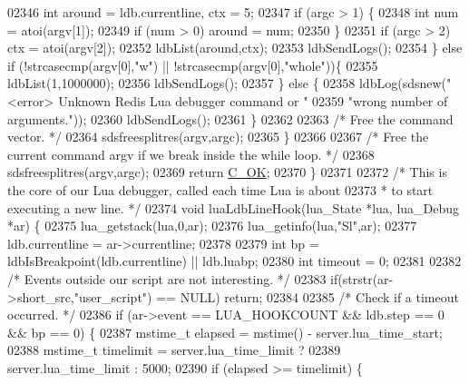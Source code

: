 \begin{DoxyCode}
{{{{{{{{{{{{{{{{{{{{{{{{02346             \textcolor{keywordtype}{int} around = ldb.currentline, ctx = 5;
02347             \textcolor{keywordflow}{if} (argc > 1) \{
02348                 \textcolor{keywordtype}{int} num = atoi(argv[1]);
02349                 \textcolor{keywordflow}{if} (num > 0) around = num;
02350             \}
02351             \textcolor{keywordflow}{if} (argc > 2) ctx = atoi(argv[2]);
02352             ldbList(around,ctx);
02353             ldbSendLogs();
02354         \} \textcolor{keywordflow}{else} \textcolor{keywordflow}{if} (!strcasecmp(argv[0],\textcolor{stringliteral}{"w"}) || !strcasecmp(argv[0],\textcolor{stringliteral}{"whole"}))\{
02355             ldbList(1,1000000);
02356             ldbSendLogs();
02357         \} \textcolor{keywordflow}{else} \{
02358             ldbLog(sdsnew(\textcolor{stringliteral}{"<error> Unknown Redis Lua debugger command or "}
02359                           \textcolor{stringliteral}{"wrong number of arguments."}));
02360             ldbSendLogs();
02361         \}
02362 
02363         \textcolor{comment}{/* Free the command vector. */}
02364         sdsfreesplitres(argv,argc);
02365     \}
02366 
02367     \textcolor{comment}{/* Free the current command argv if we break inside the while loop. */}
02368     sdsfreesplitres(argv,argc);
02369     \textcolor{keywordflow}{return} \hyperlink{server_8h_a303769ef1065076e68731584e758d3e1}{C\_OK};
02370 \}
02371 
02372 \textcolor{comment}{/* This is the core of our Lua debugger, called each time Lua is about}
02373 \textcolor{comment}{ * to start executing a new line. */}
02374 \textcolor{keywordtype}{void} luaLdbLineHook(lua\_State *lua, lua\_Debug *ar) \{
02375     lua\_getstack(lua,0,ar);
02376     lua\_getinfo(lua,\textcolor{stringliteral}{"Sl"},ar);
02377     ldb.currentline = ar->currentline;
02378 
02379     \textcolor{keywordtype}{int} bp = ldbIsBreakpoint(ldb.currentline) || ldb.luabp;
02380     \textcolor{keywordtype}{int} timeout = 0;
02381 
02382     \textcolor{comment}{/* Events outside our script are not interesting. */}
02383     \textcolor{keywordflow}{if}(strstr(ar->short\_src,\textcolor{stringliteral}{"user\_script"}) == NULL) \textcolor{keywordflow}{return};
02384 
02385     \textcolor{comment}{/* Check if a timeout occurred. */}
02386     \textcolor{keywordflow}{if} (ar->event == LUA\_HOOKCOUNT && ldb.step == 0 && bp == 0) \{
02387         mstime\_t elapsed = mstime() - server.lua\_time\_start;
02388         mstime\_t timelimit = server.lua\_time\_limit ?
02389                              server.lua\_time\_limit : 5000;
02390         \textcolor{keywordflow}{if} (elapsed >= timelimit) \{
}}}}}}}}}}}}}}}}}}}}}}}}
\end{DoxyCode}
